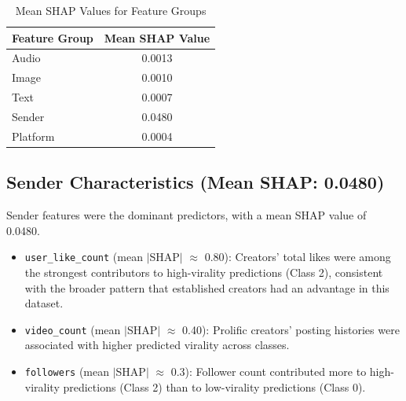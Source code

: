 \documentclass[12pt,a4paper]{report}
\begin{document}
\begin{table}[h]
    \centering
    \caption{Mean SHAP Values for Feature Groups}
    \label{tab:shap_values}
    \begin{tabular}{l S[table-format=1.4]}
        \toprule
        \textbf{Feature Group} & {\textbf{Mean SHAP Value}} \\
        \midrule
        Audio  & 0.0013 \\
        Image  & 0.0010 \\
        Text   & 0.0007 \\
        Sender & 0.0480 \\
        Platform & 0.0004 \\
        \bottomrule
    \end{tabular}
\end{table}

\subsection{Sender Characteristics (Mean SHAP: 0.0480)}
Sender features were the dominant predictors, with a mean SHAP value of 0.0480.
\begin{itemize}
    \item \texttt{user\_like\_count} (mean $|$SHAP$|$ $\approx$ 0.80): Creators’ total likes were among the strongest contributors to high-virality predictions (Class 2), consistent with the broader pattern that established creators had an advantage in this dataset.
    \item \texttt{video\_count} (mean $|$SHAP$|$ $\approx$ 0.40): Prolific creators’ posting histories were associated with higher predicted virality across classes.
    \item \texttt{followers} (mean $|$SHAP$|$ $\approx$ 0.3): Follower count contributed more to high-virality predictions (Class 2) than to low-virality predictions (Class 0).
\end{itemize}
\end{document}
